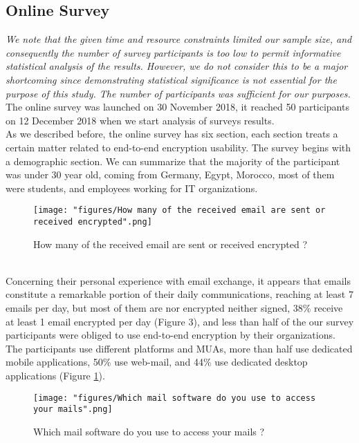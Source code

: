 \subsection{Online Survey}
\textit{We note that the given time and resource constraints limited our sample size, and consequently the number of survey participants is too low to permit informative statistical analysis of the results. However, we do not consider this to be a major shortcoming since demonstrating statistical significance is not essential for the purpose of this study. The number of participants was sufficient for our purposes.}\\
The online survey was launched on 30 November 2018, it reached 50 participants on 12 December 2018 when we start analysis of surveys results.\\
As we described before, the online survey has six section, each section treats a certain matter related to end-to-end encryption usability. The survey begins with a demographic section. We can summarize that the majority of the participant was under 30 year old, coming from Germany, Egypt, Morocco, most of them were students, and employees working for IT organizations.\\
\begin{figure}
	\texttt{[image: "figures/How many of the received email are sent or received encrypted".png]}
	\centering
	\caption{How many of the received email are sent or received encrypted ?}
\end{figure}\\
Concerning their personal experience with email exchange, it appears that emails constitute a remarkable portion of their daily communications, reaching at least 7 emails per day, but most of them are nor encrypted neither signed, 38\% receive at least 1 email encrypted per day (Figure 3), and less than half of the our survey participants were obliged to use end-to-end encryption by their organizations.\\
The participants use different platforms and MUAs, more than half use dedicated mobile applications, 50\% use web-mail, and 44\% use dedicated desktop applications (Figure \ref{fig:encryptedemail}).\\
\begin{figure}
	\texttt{[image: "figures/Which mail software do you use to access your mails".png]}
	\centering
	\caption{Which mail software do you use to access your mails ?}
	\label{fig:encryptedemail}
\end{figure}\\
